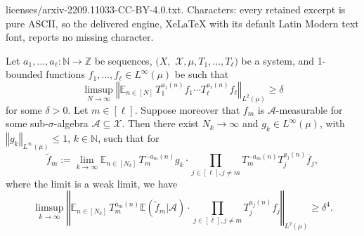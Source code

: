 \documentclass[10pt,a4paper]{amsart}
\newcommand{\CA}{{\mathcal A}}
\newcommand{\CX}{{\mathcal X}}
\newcommand{\E}{{\mathbb E}}
\newcommand{\N}{{\mathbb N}}
\newcommand{\Z}{{\mathbb Z}}
\newcommand{\norm}[1]{\left\Vert #1\right\Vert}
\begin{document}
licenses/arxiv-2209.11033-CC-BY-4.0.txt. Characters: every retained excerpt is pure ASCII, so the delivered engine, XeLaTeX with its default Latin Modern text font, reports no missing character.
\begin{lemma}\label{P:dual}
	Let $a_1,\ldots, a_\ell\colon \N\to \Z$  be sequences, $(X,$ $\CX, \mu, T_1, \ldots, T_\ell)$ be a system, and 1-bounded functions $f_1,\ldots, f_\ell\in L^\infty(\mu)$ be such that
	\begin{equation*}%
	\limsup_{N\to\infty}\norm{\E_{n\in [N]} \, T_1^{a_1(n)}f_1\cdots T_\ell^{a_\ell(n)}f_\ell}_{L^2(\mu)} \geq \delta
	\end{equation*}
	for some $\delta>0$. Let $m\in [\ell]$. Suppose moreover that $f_m$ is $\CA$-measurable for some sub-$\sigma$-algebra $\CA\subseteq\CX$. Then  there exist $N_k\to\infty$ and $g_k\in L^\infty(\mu)$, with  $\norm{g_k}_{L^\infty(\mu)}\leq 1$,  $k\in\N$, such that for
	\begin{equation*}%
	\tilde{f}_m:=\lim_{k\to\infty} \E_{n\in [N_k]}
	 \, T_m^{-a_m(n)}g_k\cdot \prod_{j\in [\ell], j\neq m}T_m^{-a_m(n)} T_j^{a_j(n)}\overline{f}_j,
	\end{equation*}
	where the limit is a weak limit, we have
	\begin{equation*}%
	\limsup_{k\to\infty}\norm{\E_{n\in[N_k]} \, T_m^{a_m(n)}\E(\tilde{f}_m|\CA)\cdot  \prod_{j\in [\ell], j\neq m}T_j^{a_j(n)}f_j}_{L^2(\mu)} \geq \delta^4.
	\end{equation*}
\end{lemma}
\end{document}
